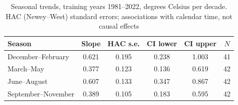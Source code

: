 \begin{table}[t]
\centering
\begin{threeparttable}
\caption{Seasonal trends, training years 1981--2022, degrees Celsius per decade. HAC (Newey--West) standard errors; associations with calendar time, not causal effects}
\label{tab:seasons}
\begin{tabular}{lccccc}
\toprule
Season & Slope & HAC s.e. & CI lower & CI upper & $N$ \\
\midrule
December--February & 0.621 & 0.195 & 0.238 & 1.003 & 41 \\
March--May & 0.377 & 0.123 & 0.136 & 0.619 & 42 \\
June--August & 0.607 & 0.133 & 0.347 & 0.867 & 42 \\
September--November & 0.389 & 0.105 & 0.183 & 0.595 & 42 \\
\bottomrule
\end{tabular}
\end{threeparttable}
\end{table}
